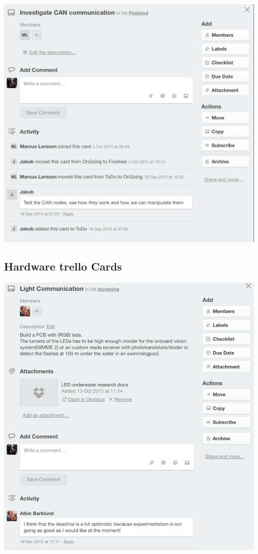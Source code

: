   \includegraphics[scale=0.5]{Screenshoot4}


\newpage
\subsection{Hardware trello Cards}

    \includegraphics[scale=0.5]{Screenshoot5}



